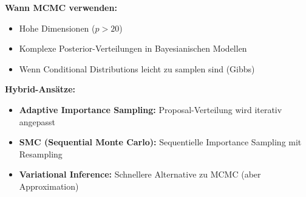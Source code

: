 \textbf{Wann MCMC verwenden:}
\begin{itemize}[leftmargin=1.5em]
    \item Hohe Dimensionen ($p > 20$)
    \item Komplexe Posterior-Verteilungen in Bayesianischen Modellen
    \item Wenn Conditional Distributions leicht zu samplen sind (Gibbs)
\end{itemize}

\textbf{Hybrid-Ansätze:}
\begin{itemize}[leftmargin=1.5em]
    \item \textbf{Adaptive Importance Sampling:} Proposal-Verteilung wird iterativ angepasst
    \item \textbf{SMC (Sequential Monte Carlo):} Sequentielle Importance Sampling mit Resampling
    \item \textbf{Variational Inference:} Schnellere Alternative zu MCMC (aber Approximation)
\end{itemize}
\newpage